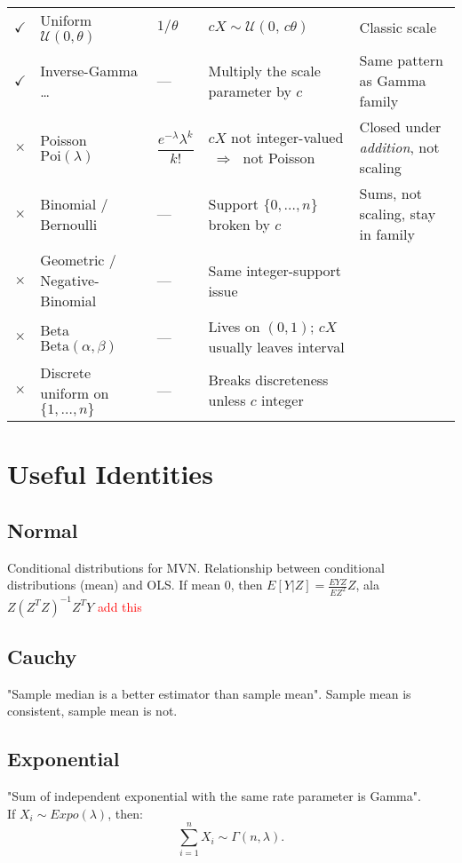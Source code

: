 \documentclass{article}
\newcommand\myworries[1]{\textcolor{red}{#1}}
\begin{document}
\begin{table}[ht]
\begin{tabular}{@{}c l l l p{4.8cm}@{}}
$\checkmark$ & Uniform $\mathcal U(0,\theta)$
             & $1/\theta$
             & $cX\sim\mathcal U(0,\,c\theta)$
             & Classic scale \\

$\checkmark$ & Inverse-Gamma …
             & —
             & Multiply the scale parameter by $c$
             & Same pattern as Gamma family \\

\midrule
$\times$ & Poisson $\mathrm{Poi}(\lambda)$
         & $\dfrac{e^{-\lambda}\lambda^{k}}{k!}$
         & $cX$ not integer-valued $\;\Rightarrow\;$ not Poisson
         & Closed under \emph{addition}, not scaling \\

$\times$ & Binomial / Bernoulli
         & —
         & Support $\{0,\dots,n\}$ broken by $c$
         & Sums, not scaling, stay in family \\

$\times$ & Geometric / Negative-Binomial
         & —
         & Same integer-support issue
         &  \\

$\times$ & Beta $\mathrm{Beta}(\alpha,\beta)$
         & —
         & Lives on $(0,1)$; $cX$ usually leaves interval
         &  \\

$\times$ & Discrete uniform on $\{1,\dots,n\}$
         & —
         & Breaks discreteness unless $c$ integer
         &  \\
\bottomrule
\end{tabular}
\end{table}

\section{Useful Identities}
\subsection{Normal}
Conditional distributions for MVN. Relationship between conditional distributions (mean) and OLS. If mean 0, then $E[Y|Z] = \frac{EYZ}{EZ^2}Z $, ala $Z (Z^TZ)^{-1} Z^T Y $  
\myworries{add this}
\subsection{Cauchy}
"Sample median is a better estimator than sample mean". Sample mean is consistent, sample mean is not. 
\subsection{Exponential}
"Sum of independent exponential with the same rate parameter is Gamma".\\
If $X_i \sim Expo(\lambda)$, then:
$$\sum_{i=1}^n X_i \sim \Gamma (n, \lambda).$$
\end{document}
